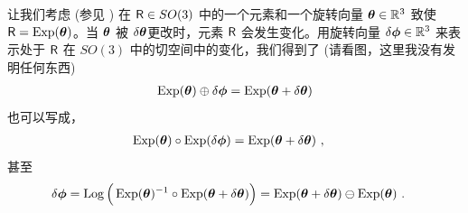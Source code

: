 让我们考虑 (参见 ) 在 $\sR\in SO(3)$ 中的一个元素和一个旋转向量 $\bth\in\bbR^3$ 致使 $\sR=\Exp(\bth)$。当 $\bth$ 被 $\dth$更改时，元素 $\sR$ 会发生变化。用旋转向量 $\delta\bfphi\in\bbR^3$ 来表示处于 $\sR$ 在 $SO(3)$ 中的切空间中的变化，我们得到了 (请看图，这里我没有发明任何东西)
%
\begin{align}
\Exp(\bth)\oplus\delta\bfphi = \Exp(\bth+\dth)
\end{align}
%
也可以写成，
%
\begin{align}
\Exp(\bth)\circ\Exp(\delta\bfphi) &= \Exp(\bth+\dth)
~,
\end{align}
%
甚至
%
\begin{align}
\delta\bfphi &= \Log\Big(\Exp(\bth)\inv\circ\Exp(\bth+\dth)\Big) = \Exp(\bth+\dth) \ominus \Exp(\bth)
~.
\end{align}

